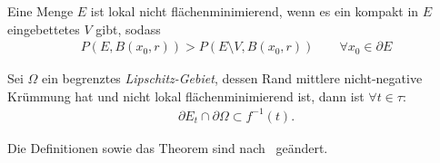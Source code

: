 \begin{Definitionbox}
    Eine Menge $E$ ist lokal nicht flächenminimierend, wenn es ein kompakt in $E$ eingebettetes $V$ gibt, sodass
    \begin{align*}
        P(E,B(x_0, r))>P(E\setminus V, B(x_0,r)) \qquad \forall x_0 \in \partial E
    \end{align*}
\end{Definitionbox}
\begin{Theorembox}
    Sei $\Omega$ ein begrenztes \emph{Lipschitz-Gebiet}, dessen Rand mittlere nicht-negative Krümmung hat und nicht lokal flächenminimierend ist, dann ist $\forall t\in \tau$:
    \begin{align*}
    \partial E_t \cap \partial \Omega \subset f^{-1}(t).
    \end{align*}
\end{Theorembox}
Die Definitionen sowie das Theorem sind nach~\cite[S. 12 f., S. 15]{gorny_functions_2024} geändert.